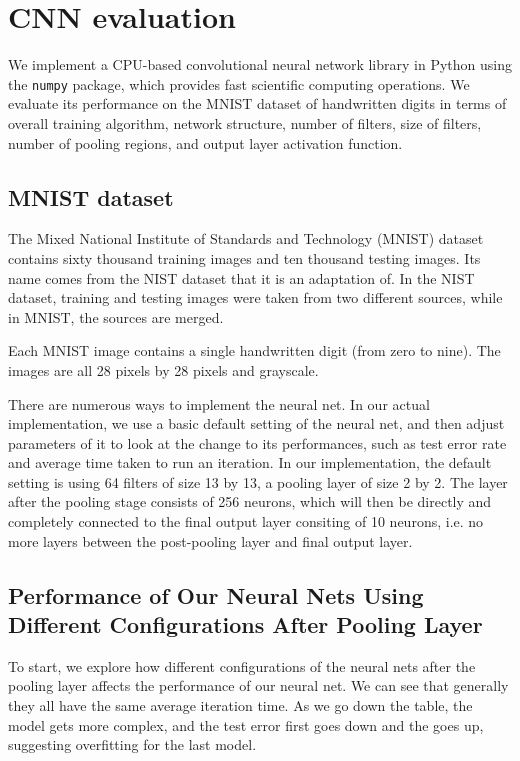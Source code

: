 \documentclass[10pt,twocolumn]{article}
\begin{document}
\section{CNN evaluation} \label{sec:evalcnn}

We implement a CPU-based convolutional neural network library \cite{git:cnn} in Python using the \texttt{numpy} package, which provides fast scientific computing operations. We evaluate its performance on the MNIST dataset of handwritten digits in terms of overall training algorithm, network structure, number of filters, size of filters, number of pooling regions, and output layer activation function.

\subsection{MNIST dataset}

The Mixed National Institute of Standards and Technology (MNIST) dataset contains sixty thousand training images and ten thousand testing images. Its name comes from the NIST dataset that it is an adaptation of. In the NIST dataset, training and testing images were taken from two different sources, while in MNIST, the sources are merged.

Each MNIST image contains a single handwritten digit (from zero to nine). The images are all 28 pixels by 28 pixels and grayscale.

There are numerous ways to implement the neural net. In our actual implementation, we use a basic default setting of the neural net, and then adjust parameters of it to look at the change to its performances, such as test error rate and average time taken to run an iteration. In our implementation, the default setting is using 64 filters of size 13 by 13, a pooling layer of size 2 by 2. The layer after the pooling stage consists of 256 neurons, which will then be directly and completely connected to the final output layer consiting of 10 neurons, i.e. no more layers between the post-pooling layer and final output layer.



\subsection{Performance of Our Neural Nets Using Different Configurations After Pooling Layer}

\FloatBarrier
To start, we explore how different configurations of the neural nets after the pooling layer affects the performance of our neural net. We can see that generally they all have the same average iteration time. As we go down the table, the model gets more complex, and the test error first goes down and the goes up, suggesting overfitting for the last model.
\end{document}
